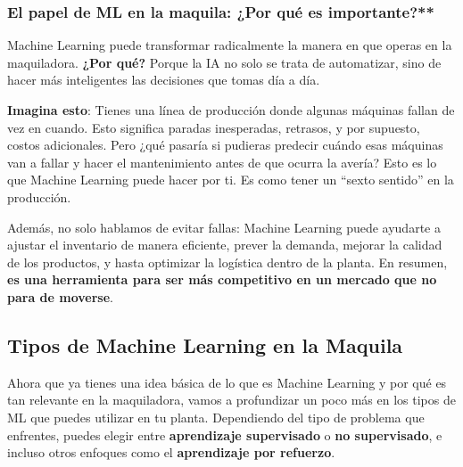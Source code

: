 \documentclass[
  10pt,
  letterpaper,
]{book}
\begin{document}
\subsubsection{El papel de ML en la maquila: ¿Por qué es
importante?**}\label{el-papel-de-ml-en-la-maquila-por-quuxe9-es-importante}

Machine Learning puede transformar radicalmente la manera en que operas
en la maquiladora. \textbf{¿Por qué?} Porque la IA no solo se trata de
automatizar, sino de hacer más inteligentes las decisiones que tomas día
a día.

\textbf{Imagina esto}: Tienes una línea de producción donde algunas
máquinas fallan de vez en cuando. Esto significa paradas inesperadas,
retrasos, y por supuesto, costos adicionales. Pero ¿qué pasaría si
pudieras predecir cuándo esas máquinas van a fallar y hacer el
mantenimiento antes de que ocurra la avería? Esto es lo que Machine
Learning puede hacer por ti. Es como tener un ``sexto sentido'' en la
producción.

Además, no solo hablamos de evitar fallas: Machine Learning puede
ayudarte a ajustar el inventario de manera eficiente, prever la demanda,
mejorar la calidad de los productos, y hasta optimizar la logística
dentro de la planta. En resumen, \textbf{es una herramienta para ser más
competitivo en un mercado que no para de moverse}.

\subsection{\texorpdfstring{\textbf{Tipos de Machine Learning en la
Maquila}}{Tipos de Machine Learning en la Maquila}}\label{tipos-de-machine-learning-en-la-maquila}

Ahora que ya tienes una idea básica de lo que es Machine Learning y por
qué es tan relevante en la maquiladora, vamos a profundizar un poco más
en los tipos de ML que puedes utilizar en tu planta. Dependiendo del
tipo de problema que enfrentes, puedes elegir entre \textbf{aprendizaje
supervisado} o \textbf{no supervisado}, e incluso otros enfoques como el
\textbf{aprendizaje por refuerzo}.
\end{document}
